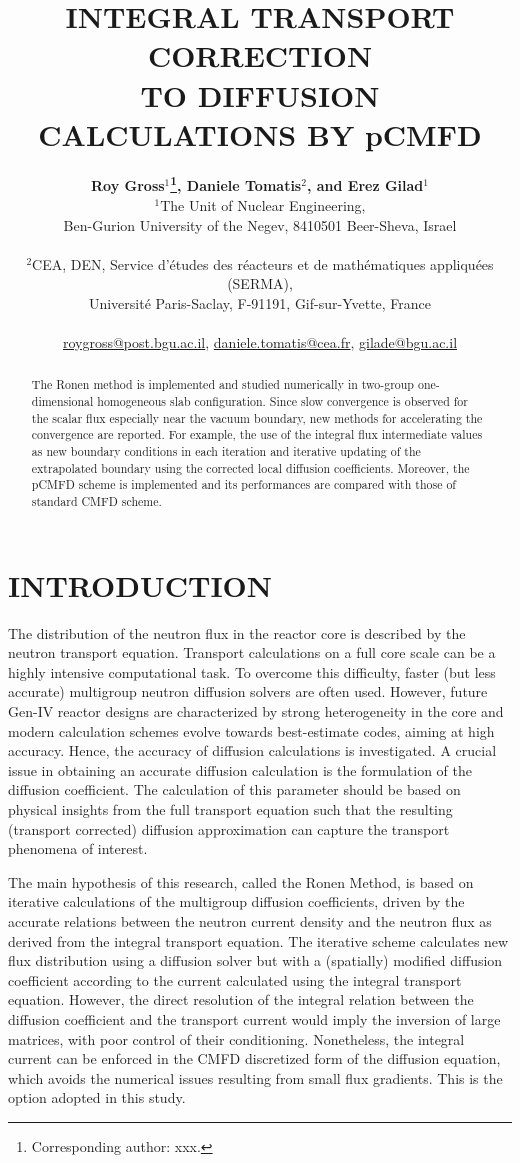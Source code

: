 \documentclass[letterpaper]{physor2020}
\title{INTEGRAL TRANSPORT CORRECTION \\TO DIFFUSION CALCULATIONS BY pCMFD}
\author{%
  \textbf{Roy Gross$^1$\footnote{Corresponding author: xxx.},
          Daniele Tomatis$^2$,
          and Erez Gilad$^1$} \\
  $^1$The Unit of Nuclear Engineering, \\
  Ben-Gurion University of the Negev, 8410501 Beer-Sheva, Israel \\
\\
  $^2$CEA, DEN, Service d’\'etudes des r\'eacteurs et
      de math\'ematiques appliqu\'ees (SERMA), \\
    Universit\'e Paris-Saclay, F-91191, Gif-sur-Yvette, France \\
     \\
  \url{roygross@post.bgu.ac.il}, \url{daniele.tomatis@cea.fr}, \url{gilade@bgu.ac.il}
}
\begin{document}
\maketitle
\justify

\begin{abstract}
  The Ronen method is implemented and studied numerically in two-group one-dimensional homogeneous slab configuration. Since slow convergence is observed for the scalar flux especially near the vacuum boundary, new methods for accelerating the convergence are reported. For example, the use of the integral flux intermediate values as new boundary conditions in each iteration and iterative updating of the extrapolated boundary using the corrected local diffusion coefficients. Moreover, the pCMFD scheme is implemented and its performances are compared with those of standard CMFD scheme.
\end{abstract}

\section{INTRODUCTION}
\label{sec:intro}

The distribution of the neutron flux in the reactor core is described by the neutron transport equation. Transport calculations on a full core scale can be a highly intensive computational task. To overcome this difficulty, faster (but less accurate) multigroup neutron diffusion solvers are often used. However, future Gen-IV reactor designs are characterized by strong heterogeneity in the core and modern calculation schemes evolve towards best-estimate codes, aiming at high accuracy. Hence, the accuracy of diffusion calculations is investigated. A crucial issue in obtaining an accurate diffusion calculation is the formulation of the diffusion coefficient. The calculation of this parameter should be based on physical insights from the full transport equation such that the resulting (transport corrected) diffusion approximation can capture the transport phenomena of interest.

The main hypothesis of this research, called the Ronen Method, is based on iterative calculations of the multigroup diffusion coefficients, driven by the accurate relations between the neutron current density and the neutron flux as derived from the integral transport equation. The iterative scheme calculates new flux distribution using a diffusion solver but with a (spatially) modified diffusion coefficient according to the current calculated using the integral transport equation. However, the direct resolution of the integral relation between the diffusion coefficient and the transport current would imply the inversion of large matrices, with poor control of their conditioning. Nonetheless, the integral current can be enforced in the CMFD discretized form of the diffusion equation, which avoids the numerical issues resulting from small flux gradients. This is the option adopted in this study.
\end{document}
